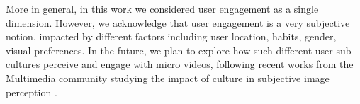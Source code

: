 More in general,  in this work we considered user engagement as a single dimension. However, we acknowledge that user engagement is a very subjective notion, impacted by different factors including user location, habits, gender, visual preferences. In the future, we plan to explore how such different user sub-cultures perceive and engage with micro videos, following recent works from the Multimedia community studying the impact of culture in subjective image perception \cite{jou2015visual}.
%
%
%
%
%
% 
